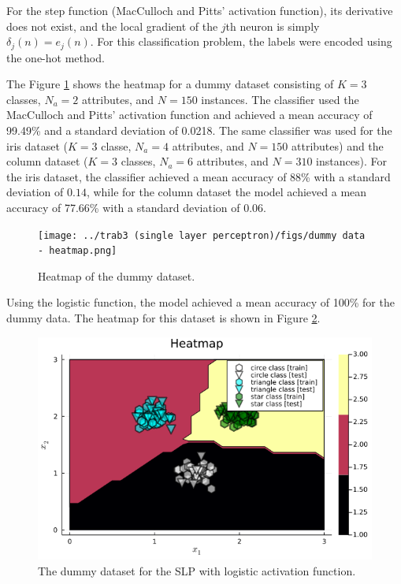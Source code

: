 \documentclass[12pt,a4paper]{article}
\begin{document}
For the step function (MacCulloch and Pitts' activation function), its derivative does not exist, and the local gradient of the \(j\)th neuron is simply \(\delta_j(n) = e_j (n)\). For this classification problem, the labels were encoded using the one-hot method.

The Figure \ref{fig:heatmap-dummy-dataset} shows the heatmap for a dummy dataset consisting of \(K=3\) classes, \(N_a=2\) attributes, and \(N=150\) instances. The classifier used the MacCulloch and Pitts' activation function and achieved a mean accuracy of 99.49\% and a standard deviation of 0.0218. The same classifier was used for the iris dataset (\(K=3\) classe, \(N_a=4\) attributes, and \(N=150\) attributes) and the column dataset (\(K=3\) classes, \(N_a=6\) attributes, and \(N=310\) instances). For the iris dataset, the classifier achieved a mean accuracy of 88\% with a standard deviation of \(0.14\), while for the column dataset the model achieved a mean accuracy of 77.66\% with a standard deviation of \(0.06\).

\begin{figure}[H]
    \centering
    \texttt{[image: ../trab3 (single layer perceptron)/figs/dummy data - heatmap.png]}
    \caption{Heatmap of the dummy dataset.}
    \label{fig:heatmap-dummy-dataset}
\end{figure}

Using the logistic function, the model achieved a mean accuracy of 100\% for the dummy data. The heatmap for this dataset is shown in Figure \ref{fig:dummy-data-heatmap}.


\begin{figure}[H]
    \centering
    \includegraphics[scale=0.4]{../trab4 (single layer perceptron with sigmoidal functions)/figs/dummy data - heatmap.png}%
    
    \caption{The dummy dataset for the SLP with logistic activation function.}
    \label{fig:dummy-data-heatmap}
\end{figure}
\end{document}
